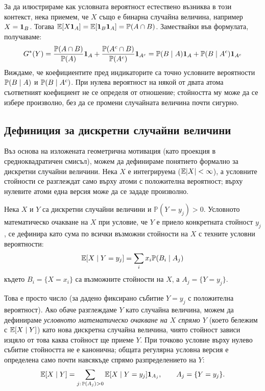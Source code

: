 За да илюстрираме как условната вероятност естествено възниква в този контекст, нека приемем, че $X$ също е бинарна случайна величина, например $X = \mathbf{1}_B$. Тогава $\mathbb{E}[X\mathbf{1}_A] = \mathbb{E}[\mathbf{1}_B \mathbf{1}_A] = \mathbb{P}(A \cap B)$. Замествайки във формулата, получаваме:
\[
G^*(Y) = \frac{\mathbb{P}(A \cap B)}{\mathbb{P}(A)} \mathbf{1}_A + \frac{\mathbb{P}(A^c \cap B)}{\mathbb{P}(A^c)} \mathbf{1}_{A^c} = \mathbb{P}(B\mid A)\mathbf{1}_A + \mathbb{P}(B\mid A^c)\mathbf{1}_{A^c}
\]
Виждаме, че коефициентите пред индикаторите са точно условните вероятности $\mathbb{P}(B\mid A)$ и $\mathbb{P}(B\mid A^c)$. При нулева вероятност на някой от двата атома съответният коефициент не се определя от отношение; стойността му може да се избере произволно, без да се промени случайната величина почти сигурно.

\subsection{Дефиниция за дискретни случайни величини}

Въз основа на изложената геометрична мотивация (като проекция в средноквадратичен смисъл), можем да дефинираме понятието формално за дискретни случайни величини. Нека $X$ е интегрируема ($\mathbb{E}|X|<\infty$), а условните стойности се разглеждат само върху атоми с положителна вероятност; върху нулевите атоми една версия може да се зададе произволно.

\begin{keydefn}
Нека $X$ и $Y$ са дискретни случайни величини и $\mathbb{P}(Y=y_j)>0$. Условното математическо очакване на $X$ при условие, че $Y$ е приело конкретната стойност $y_j$, се дефинира като сума по всички възможни стойности на $X$ с техните условни вероятности:
\[
\mathbb{E}[X \mid Y=y_j] = \sum_i x_i \mathbb{P}(B_i \mid A_j)
\]
където $B_i = \{X=x_i\}$ са възможните стойности на $X$, а $A_j = \{Y=y_j\}$.
\end{keydefn}

Това е просто число (за дадено фиксирано събитие $Y=y_j$ с положителна вероятност). Ако обаче разглеждаме $Y$ като случайна величина, можем да дефинираме \emph{условното математическо очакване на $X$ спрямо $Y$} (което бележим с $\mathbb{E}[X\mid Y]$) като нова дискретна случайна величина, чиято стойност зависи изцяло от това каква стойност ще приеме $Y$. При точково условие върху нулево събитие стойността не е канонична; общата регулярна условна версия е определена само почти навсякъде спрямо разпределението на $Y$:
\[
\mathbb{E}[X \mid Y] = \sum_{j:\,\mathbb{P}(A_j)>0} \mathbb{E}[X \mid Y=y_j] \mathbf{1}_{A_j},
\qquad A_j=\{Y=y_j\}.
\]

